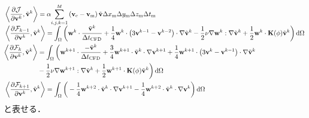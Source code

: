 \documentclass[a4paper,xelatex,ja=standard]{bxjsarticle}
\begin{document}
\begin{align}
    &\left\langle\frac{\partial \mathcal{J}}{\partial \mathbf{v}^k}, \tilde{\mathbf{v}}^k\right\rangle
    =  \alpha \smash{\sum_{i, j, k=1}^{M}} \left(\mathbf{v}_\text{c}-\mathbf{v}_{\text{m}}\right) \tilde{\mathbf{v}} \Delta x_{\mathrm{m}} \Delta y_{\mathrm{m}} \Delta z_{\mathrm{m}} \Delta t_{\mathrm{m}} \\
    &\left\langle\frac{\partial \mathcal{F}_{k-1}}{\partial \mathbf{v}^k}, \tilde{\mathbf{v}}^k\right\rangle
    = \int_{\Omega} \bigg( \mathbf{w}^{k} \cdot \frac{\tilde{\mathbf{v}}^k}{\Delta t_{\text{CFD}}} + \frac{1}{4} \mathbf{w}^{k} \cdot \left( 3\mathbf{v}^{k-1} - \mathbf{v}^{k-2} \right) \cdot \nabla \tilde{\mathbf{v}}^{k} 
    - \frac{1}{2} \nu \nabla \mathbf{w}^{k}: \nabla \tilde{\mathbf{v}}^k + \frac{1}{2} \mathbf{w}^{k} \cdot \mathbf{K}(\phi) \tilde{\mathbf{v}}^k \bigg) \, \mathrm{d}\Omega \\
    &\begin{aligned}
        \left\langle\frac{\partial \mathcal{F}_k}{\partial \mathbf{v}^k}, \tilde{\mathbf{v}}^k\right\rangle
        &= \int_{\Omega} \bigg( \mathbf{w}^{k+1} \cdot \frac{-\tilde{\mathbf{v}}^k}{\Delta t_{\text{CFD}}} + \frac{3}{4} \mathbf{w}^{k+1} \cdot \tilde{\mathbf{v}}^k \cdot \nabla \mathbf{v}^{k+1} + \frac{1}{4} \mathbf{w}^{k+1} \cdot \left( 3\mathbf{v}^k - \mathbf{v}^{k-1} \right) \cdot \nabla \tilde{\mathbf{v}}^{k} \\
        &- \frac{1}{2} \nu \nabla \mathbf{w}^{k+1}: \nabla \tilde{\mathbf{v}}^k + \frac{1}{2} \mathbf{w}^{k+1} \cdot \mathbf{K}(\phi) \tilde{\mathbf{v}}^k \bigg) \, \mathrm{d}\Omega
    \end{aligned} \\
    &\left\langle\frac{\partial \mathcal{F}_{k+1}}{\partial \mathbf{v}^k}, \tilde{\mathbf{v}}^k\right\rangle
    = \int_{\Omega} \bigg( - \frac{1}{4}\mathbf{w}^{k+2} \cdot \tilde{\mathbf{v}}^{k} \cdot \nabla \mathbf{v}^{k+1} 
    - \frac{1}{4} \mathbf{w}^{k+2} \cdot \tilde{\mathbf{v}}^{k} \cdot \nabla \mathbf{v}^{k}\bigg) \, \mathrm{d}\Omega 
\end{align}
と表せる．
\end{document}
